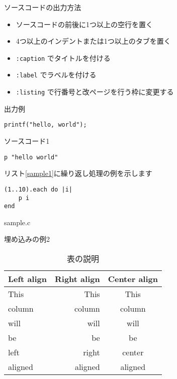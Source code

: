 \documentclass[a4j]{jarticle}
\begin{document}
ソースコードの出力方法

\begin{itemize}
\item ソースコードの前後に1つ以上の空行を置く
\item 4つ以上のインデントまたは1つ以上のタブを置く
\item {\tt :caption} でタイトルを付ける
\item {\tt :label} でラベルを付ける
\item {\tt :listing} で行番号と改ページを行う枠に変更する
\end{itemize}

出力例

\begin{screen}
\begin{verbatim}
printf("hello, world");
\end{verbatim}
\end{screen}

\begin{itembox}[c]{ソースコード1}
\begin{verbatim}
p "hello world"
\end{verbatim}
\end{itembox}

リスト\ref{sample1}に繰り返し処理の例を示します

\begin{lstlisting}[caption=繰り返しの例 ,label=sample1]
(1..10).each do |i|
	p i
end
\end{lstlisting}


{sample.c}

\begin{itembox}[c]{埋め込みの例2}
{\small

}
\end{itembox}

\begin{table}[h]
\centering
\caption{表の説明 }
\label{table:1}
\begin{tabular}{|l|r|c|}
\hline
Left align & Right align & Center align\\
\hline
This & This & This\\
column & column & column\\
will & will & will\\
be & be & be\\
left & right & center\\
aligned & aligned & aligned\\
\hline
\end{tabular}
\end{table}
\end{document}
